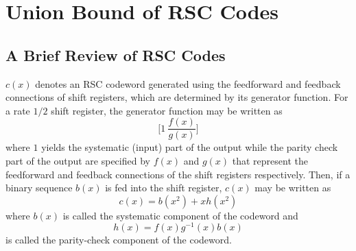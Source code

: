 \section{Union Bound of RSC Codes}
\label{sec2}
\subsection{A Brief Review of RSC Codes}
$c(x)$ denotes an RSC codeword generated using the feedforward and feedback connections of shift registers, which are determined by its generator function. For a rate $1/2$ shift register, the generator function may be written as  $$\Big[1 ~\frac{f(x)}{g(x)}\Big]$$ where $1$ yields the systematic (input) part  of the output while the parity check part of the output are specified by  $f(x)$ and $g(x)$ that represent the feedforward and feedback connections of the shift registers respectively. Then, if a binary sequence $b(x)$ is fed into the shift register, $c(x)$ may be written as 
\begin{equation}
c(x) = b(x^2)+xh(x^2)
\label{codeword-comp}
\end{equation}
where $b(x)$ is called the systematic component of the codeword and
\begin{equation}
h(x) =f(x)g^{-1}(x)b(x)
\label{eq:parity-def}
\end{equation}
 is called the parity-check component of the codeword.






